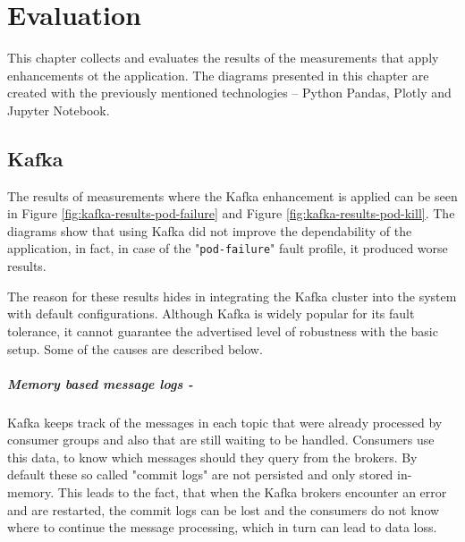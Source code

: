 \chapter{Evaluation} \label{evaluation}

This chapter collects and evaluates the results of the measurements that apply enhancements ot the application. The diagrams presented in this chapter are created with the previously mentioned technologies -- Python Pandas, Plotly and Jupyter Notebook.


\section{Kafka}

The results of measurements where the Kafka enhancement is applied can be seen in Figure \ref{fig:kafka-results-pod-failure} and Figure \ref{fig:kafka-results-pod-kill}. The diagrams show that using Kafka did not improve the dependability of the application, in fact, in case of the "\texttt{pod-failure}" fault profile, it produced worse results.

The reason for these results hides in integrating the Kafka cluster into the system with default configurations. Although Kafka is widely popular for its fault tolerance, it cannot guarantee the advertised level of robustness with the basic setup. Some of the causes are described below.

\paragraph{Memory based message logs -}Kafka keeps track of the messages in each topic that were already processed by consumer groups and also that are still waiting to be handled. Consumers use this data, to know which messages should they query from the brokers. By default these so called "commit logs" are not persisted and only stored in-memory. This leads to the fact, that when the Kafka brokers encounter an error and are restarted, the commit logs can be lost and the consumers do not know where to continue the message processing, which in turn can lead to data loss.

